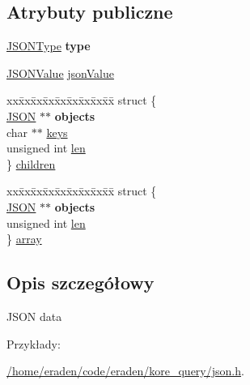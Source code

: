 \subsection*{Atrybuty publiczne}
\begin{DoxyCompactItemize}
\item 
\hyperlink{json_8h_af761d54284482a1af5a01d8f52845b49}{J\+S\+O\+N\+Type} {\bfseries type}\hypertarget{structsJSON_addb339436be83da160932a530dce47d1}{}\label{structsJSON_addb339436be83da160932a530dce47d1}

\item 
\hyperlink{json_8h_acb7eaa79e9cdd0740c01726c3ba06e3e}{J\+S\+O\+N\+Value} \hyperlink{structsJSON_ae4d7953fe5e0369930ba3ddd91d64743}{json\+Value}
\item 
\begin{tabbing}
xx\=xx\=xx\=xx\=xx\=xx\=xx\=xx\=xx\=\kill
struct \{\\
\>\hyperlink{json_8h_a883822215fcdb974b95ff5339b5ecab4}{JSON} $\ast$$\ast$ {\bfseries objects}\\
\>char $\ast$$\ast$ \hyperlink{structsJSON_a3db035c9589ee45acad7efa117cbf1a7}{keys}\\
\>unsigned int \hyperlink{structsJSON_a0180ac53bd69e91ecfa80ace5a1c3f91}{len}\\
\} \hyperlink{structsJSON_a3c49fa17c184d6be197b183d759c4585}{children}\\

\end{tabbing}\item 
\begin{tabbing}
xx\=xx\=xx\=xx\=xx\=xx\=xx\=xx\=xx\=\kill
struct \{\\
\>\hyperlink{json_8h_a883822215fcdb974b95ff5339b5ecab4}{JSON} $\ast$$\ast$ {\bfseries objects}\\
\>unsigned int \hyperlink{structsJSON_a0180ac53bd69e91ecfa80ace5a1c3f91}{len}\\
\} \hyperlink{structsJSON_a4c8ba3fc09489bdb99aca27ef7fff535}{array}\\

\end{tabbing}\end{DoxyCompactItemize}


\subsection{Opis szczegółowy}
J\+S\+ON data \begin{Desc}
\item[Przykłady\+: ]\par
\hyperlink{_2home_2eraden_2code_2eraden_2kore_query_2json_8h-example}{/home/eraden/code/eraden/kore\+\_\+query/json.\+h}.\end{Desc}


